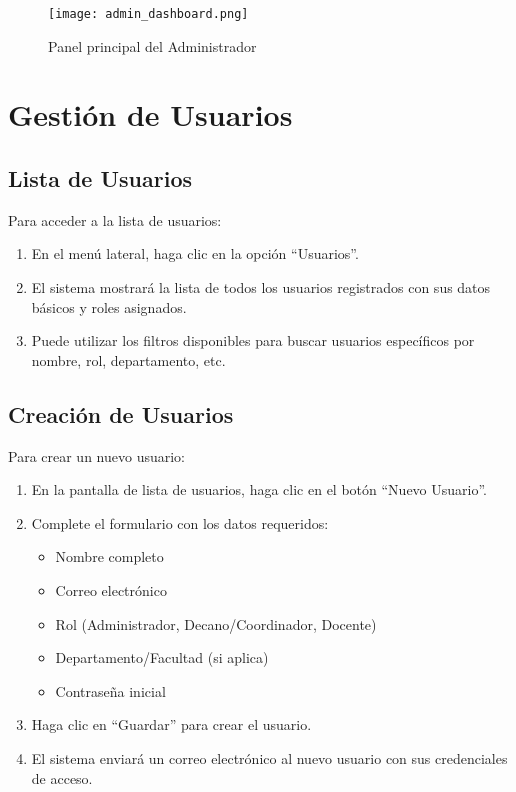 \documentclass[12pt,a4paper]{book}
\begin{document}
\begin{figure}[H]
    \centering
    \texttt{[image: admin\_dashboard.png]}
    \caption{Panel principal del Administrador}
    \label{fig:admin_dashboard}
\end{figure}

\section{Gestión de Usuarios}
\subsection{Lista de Usuarios}
Para acceder a la lista de usuarios:

\begin{enumerate}
    \item En el menú lateral, haga clic en la opción ``Usuarios''.
    \item El sistema mostrará la lista de todos los usuarios registrados con sus datos básicos y roles asignados.
    \item Puede utilizar los filtros disponibles para buscar usuarios específicos por nombre, rol, departamento, etc.
\end{enumerate}

\subsection{Creación de Usuarios}
Para crear un nuevo usuario:

\begin{enumerate}
    \item En la pantalla de lista de usuarios, haga clic en el botón ``Nuevo Usuario''.
    \item Complete el formulario con los datos requeridos:
    \begin{itemize}
        \item Nombre completo
        \item Correo electrónico
        \item Rol (Administrador, Decano/Coordinador, Docente)
        \item Departamento/Facultad (si aplica)
        \item Contraseña inicial
    \end{itemize}
    \item Haga clic en ``Guardar'' para crear el usuario.
    \item El sistema enviará un correo electrónico al nuevo usuario con sus credenciales de acceso.
\end{enumerate}
\end{document}
